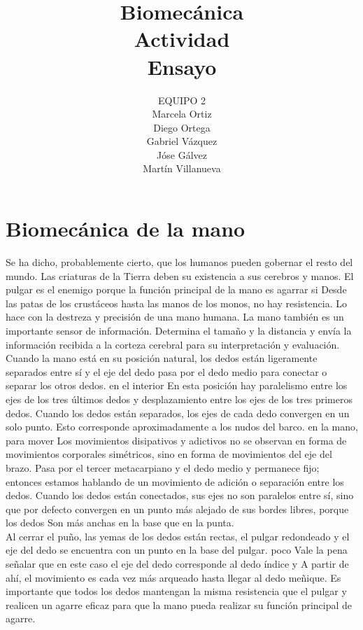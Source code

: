 \documentclass{article}
\author{EQUIPO 2\\Marcela Ortiz
\\Diego Ortega
\\Gabriel V\'{a}zquez
\\J\'{o}se G\'{a}lvez
\\Mart\'{i}n Villanueva\\
} %
\title{Biomecánica\\Actividad\\Ensayo} %
\date{}
\begin{document}

\maketitle %


\section{Biomec\'{a}nica de la mano}\label{intro} %
Se ha dicho, probablemente cierto, que los humanos pueden gobernar el resto del mundo.
Las criaturas de la Tierra deben su existencia a sus cerebros y manos.
El pulgar es el enemigo porque la función principal de la mano es agarrar si
Desde las patas de los crustáceos hasta las manos de los monos, no hay resistencia.
Lo hace con la destreza y precisión de una mano humana. La mano también es un importante sensor de información. Determina el tamaño y la distancia y envía la información recibida a la corteza cerebral para su interpretación y evaluación.
\\
Cuando la mano está en su posición natural, los dedos están ligeramente separados entre sí y el eje del dedo pasa por el dedo medio para conectar o separar los otros dedos. en el interior
En esta posición hay paralelismo entre los ejes de los tres últimos dedos y desplazamiento entre los ejes de los tres primeros dedos. Cuando los dedos están separados, los ejes de cada dedo convergen en un solo punto.
Esto corresponde aproximadamente a los nudos del barco. en la mano, para mover
Los movimientos disipativos y adictivos no se observan en forma de movimientos corporales simétricos, sino en forma de movimientos del eje del brazo.
Pasa por el tercer metacarpiano y el dedo medio y permanece fijo; entonces estamos hablando de un movimiento de adición o separación entre los dedos. Cuando los dedos están conectados, sus ejes no son paralelos entre sí, sino que por defecto convergen en un punto más alejado de sus bordes libres, porque los dedos
Son más anchas en la base que en la punta.
\\
Al cerrar el puño, las yemas de los dedos están rectas, el pulgar redondeado y el eje del dedo se encuentra con un punto en la base del pulgar.
poco Vale la pena señalar que en este caso el eje del dedo corresponde al dedo índice y
A partir de ahí, el movimiento es cada vez más arqueado hasta llegar al dedo meñique.
Es importante que todos los dedos mantengan la misma resistencia que el pulgar y realicen un agarre eficaz para que la mano pueda realizar su función principal de agarre.
\end{document}
